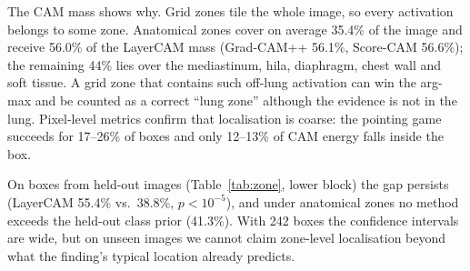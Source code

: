 \documentclass[pdflatex,sn-mathphys-num]{sn-jnl}
\begin{document}
The CAM mass shows why. Grid zones tile the whole image, so every activation belongs to some zone. Anatomical zones cover on average 35.4\% of the image and receive 56.0\% of the LayerCAM mass (Grad-CAM++ 56.1\%, Score-CAM 56.6\%); the remaining 44\% lies over the mediastinum, hila, diaphragm, chest wall and soft tissue. A grid zone that contains such off-lung activation can win the arg-max and be counted as a correct ``lung zone'' although the evidence is not in the lung. Pixel-level metrics confirm that localisation is coarse: the pointing game succeeds for 17--26\% of boxes and only 12--13\% of CAM energy falls inside the box.

On boxes from held-out images (Table~\ref{tab:zone}, lower block) the gap persists (LayerCAM 55.4\% vs.\ 38.8\%, $p<10^{-5}$), and under anatomical zones no method exceeds the held-out class prior (41.3\%). With 242 boxes the confidence intervals are wide, but on unseen images we cannot claim zone-level localisation beyond what the finding's typical location already predicts.
\end{document}
